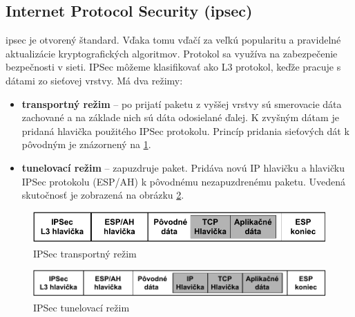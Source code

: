 \subsection{Internet Protocol Security (\acrshort{ipsec})}
\acrshort{ipsec} je otvorený štandard. Vďaka tomu vďačí za veľkú popularitu a pravidelné aktualizácie kryptografických algoritmov. Protokol sa využíva na zabezpečenie bezpečnosti v sieti. IPSec môžeme klasifikovať ako L3 protokol, keďže pracuje s dátami zo sieťovej vrstvy. Má dva režimy:
\begin{itemize}
	\item{\textbf{transportný režim}} -- po prijatí paketu z vyššej vrstvy sú smerovacie dáta zachované a na základe nich sú dáta odosielané ďalej. K zvyšným dátam je pridaná hlavička použitého IPSec protokolu. Princíp pridania sieťových dát k pôvodným je znázornený na \ref{iptransport}.  
	\item{\textbf{tunelovací režim}} -- zapuzdruje paket. Pridáva novú IP hlavičku a hlavičku IPSec protokolu (ESP/AH) k pôvodnému nezapuzdrenému paketu. Uvedená skutočnosť je zobrazená na obrázku \ref{iptunel}.
\end{itemize}
\begin{figure} [!h]
	\centering
	\includegraphics[width=\textwidth]{figures/iptransport}
	\caption{IPSec transportný režim}
	\label{iptransport}
\end{figure}
\begin{figure} [!h]
	\centering
	\includegraphics[width=\textwidth]{figures/iptunel}
	\caption{IPSec tunelovací režim}
	\label{iptunel}
\end{figure}



